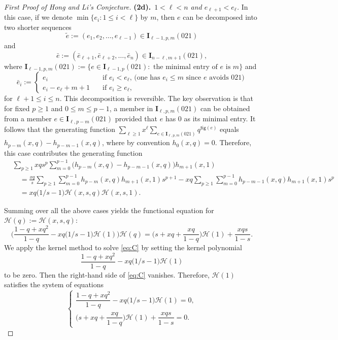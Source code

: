 \documentclass[reqno]{amsart}
\numberwithin{equation}{section}
\theoremstyle{plain}
\theoremstyle{definition}
\theoremstyle{named}
\newcommand{\bI}{\mathbf{I}}
\newcommand{\tig}{\mathsf{tig}}
\newcommand{\cH}{\mathcal{H}}
\begin{document}
\begin{proof}[First Proof of Hong and Li's Conjecture]
	\textbf{(2d).}~\textit{$1<\ell<n$ and $e_{\ell+1}<e_{\ell}$.} In this case, if we denote  $\min\{e_i: 1\leq i<\ell\}$ by $m$, then $e$ can be decomposed into two shorter sequences
	$$
	\tilde{e}:=(e_1,e_2,\ldots,e_{\ell-1})\in\bI_{\ell-1,p,m}(021)
	$$
	and 
	$$\bar{e}:=(\bar e_{\ell+1},\bar e_{\ell+2},\ldots,\bar{e}_n)\in\bI_{n-\ell,m+1}(021),$$
	where $\bI_{\ell-1,p,m}(021):=\{e\in\bI_{\ell-1,p}(021):\text{ the minimal entry of $e$ is $m$}\}$ and 
	$$
	\bar e_i:=
	\begin{cases}
		e_i&\quad\text{if $e_i<e_{\ell}$, (one has $e_i\leq m$ since $e$ avoids $021$)}\\
		e_i-e_{\ell}+m+1&\quad\text{if $e_i\geq e_{\ell}$,}
	\end{cases}
	$$
	for $\ell+1\leq i\leq n$. This decomposition is reversible. The key observation is that for fixed $p\geq1$ and $0\leq m\leq p-1$, a member in $\bI_{\ell,p,m}(021)$ can be obtained from a member $e\in\bI_{\ell,p-m}(021)$ provided that $e$ has $0$ as its minimal entry. 
	It follows that the generating function 
	$\sum_{\ell\geq1}x^{\ell}\sum_{e\in\bI_{\ell,p,m}(021)}q^{\tig(e)}$ equals $h_{p-m}(x,q)-h_{p-m-1}(x,q)$, where by convention $h_0(x,q)=0$. Therefore, this case contributes the generating function 
	\begin{align*}
		&\sum_{p\geq1}xqs^p\sum_{m=0}^{p-1}\big(h_{p-m}(x,q)-h_{p-m-1}(x,q)\big) h_{m+1}(x,1)\\
		&\quad=\frac{xq}{s}\sum_{p\geq1}\sum_{m=0}^{p-1}h_{p-m}(x,q)h_{m+1}(x,1)s^{p+1}-xq\sum_{p\geq1}\sum_{m=0}^{p-1}h_{p-m-1}(x,q)h_{m+1}(x,1)s^p\\
		&\quad=xq\big(1/s-1\big)\cH(x,s,q)\cH(x,s,1). 
	\end{align*}

	Summing over all the above cases yields the functional equation for $\cH(q):=\cH(x,s,q)$:
	\begin{equation}\label{eq:C}
		\bigg(\frac{1-q+xq^2}{1-q}-xq\big(1/s-1\big)\cH(1)\bigg)\cH(q)=\bigg(s+xq+\frac{xq}{1-q}\bigg)\cH(1)+\frac{xqs}{1-s}.
	\end{equation}
	We apply the kernel method to solve \eqref{eq:C} by setting the kernel polynomial
	$$\frac{1-q+xq^2}{1-q}-xq\big(1/s-1\big)\cH(1)$$ 
	to be zero. Then the right-hand side of \eqref{eq:C} vanishes. Therefore, $\cH(1)$ satisfies the system of equations
	\begin{equation}\label{sys:ker1}
		\begin{cases}
			\dfrac{1-q+xq^2}{1-q}-xq\big(1/s-1\big)\cH(1)=0,\\[12pt]
			\bigg(s+xq+\dfrac{xq}{1-q}\bigg)\cH(1)+\dfrac{xqs}{1-s}=0.
		\end{cases}
	\end{equation}


\end{proof}
\end{document}

